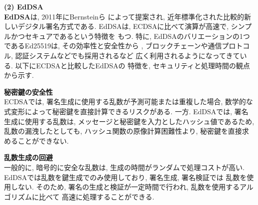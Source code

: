 \documentclass[a4j,9pt,twocolumn]{jsarticle}
\begin{document}
\noindent\textbf{(2) EdDSA}\\
\indent \textbf{EdDSA}は,  2011年にBernsteinら\cite{eddsa}
によって提案され, 近年標準化された比較的新しいデジタル署名方式である. 
EdDSAは, ECDSAに比べて演算が高速で, シンプルかつセキュアであるという特徴を
もつ. 特に, EdDSAのバリエーションの1つであるEd25519は, その効率性と安全性から
, ブロックチェーンや通信プロトコル, 認証システムなどでも採用されるなど
広く利用されるようになってきている. 以下にECDSAと比較したEdDSAの
特徴を, セキュリティと処理時間の観点から示す.
\smallskip
\begin{description}[labelwidth=3mm, labelsep=2mm]
    \item[(i)] \textbf{秘密鍵の安全性}\\
    ECDSAでは, 署名生成に使用する乱数が予測可能または重複した場合, 
    数学的な式変形によって秘密鍵を直接計算できるリスクがある. 一方. EdDSAでは, 
    署名生成に使用する乱数は, メッセージと秘密鍵を入力としたハッシュ値であるため, 
    乱数の漏洩したとしても, ハッシュ関数の原像計算困難性より, 
    秘密鍵を直接求めることができない. 





\end{description}
\smallskip
\begin{description}[labelwidth=3mm, labelsep=2mm]
    \item[(ii)] \textbf{乱数生成の回避}\\
    一般的に, 暗号的に安全な乱数は, 生成の時間がランダムで処理コストが高い.
    EdDSAでは乱数を鍵生成でのみ使用しており, 署名生成, 署名検証では
    乱数を使用しない. そのため, 署名の生成と検証が一定時間で行われ, 乱数を使用するアルゴリズムに比べて
    高速に処理することができる.
\end{description}
\end{document}
